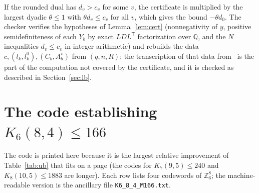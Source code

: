 \documentclass[11pt]{amsart}
\newcommand{\Kq}[3]{K_{#1}(#2,#3)}
\begin{document}
If the rounded dual has $d_v>c_v$ for some $v$, the certificate is
multiplied by the largest dyadic $\theta\le 1$ with $\theta d_v\le c_v$ for
all $v$, which gives the bound $-\theta d_0$. The checker verifies the
hypotheses of Lemma~\ref{lem:cert} (nonnegativity of $y$, positive
semidefiniteness of each $Y_b$ by exact $LDL^{\mathsf T}$ factorization
over $\mathbb{Q}$, and the $N$ inequalities $d_v\le c_v$ in integer
arithmetic) and rebuilds the data $c,(l_k,l_k^0),(C_b,A_b^v)$ from
$(q,n,R)$; the transcription of that data from~\cite{GijswijtPolak} is
the part of the computation not covered by the certificate, and it is
checked as described in Section~\ref{sec:lb}.

\section{The code establishing $\Kq{6}{8}{4}\le 166$}\label{app:code}
The code is printed here because it is the largest relative improvement
of Table~\ref{tab:ub} that fits on a page (the codes for
$\Kq{7}{9}{5}\le 240$ and $\Kq{8}{10}{5}\le 1883$ are longer). Each row
lists four codewords of $\mathbb{Z}_6^8$; the machine-readable version is
the ancillary file \texttt{K6\_8\_4\_M166.txt}.

{\scriptsize

}
\end{document}
